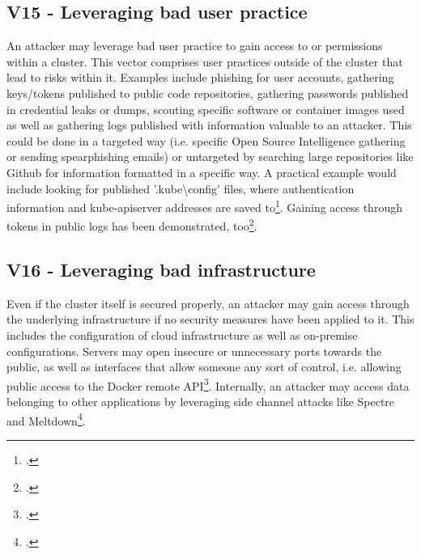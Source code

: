\subsection{V15 - Leveraging bad user practice}
An attacker may leverage bad user practice to gain access to or permissions within a cluster. 
This vector comprises user practices outside of the cluster that lead to risks within it.
Examples include phishing for user accounts, gathering keys/tokens published to public code repositories, gathering passwords published in credential leaks or dumps, scouting specific software or container images used as well as gathering logs published with information valuable to an attacker.
This could be done in a targeted way (i.e. specific Open Source Intelligence gathering or sending spearphishing emails) or untargeted by searching large repositories like Github for information formatted in a specific way. A practical example would include looking for published '.kube\textbackslash config' files, where authentication information and kube-apiserver addresses are saved to\footcite[][, section 'Define clusters, users, and contexts']{kubectlClusterAccess}. Gaining access through tokens in public logs has been demonstrated, too\footcite[][, section 'Results and notable findings']{ciKnew}.


\subsection{V16 - Leveraging bad infrastructure} \label{v16}
Even if the cluster itself is secured properly, an attacker may gain access through the underlying infrastructure if no security measures have been applied to it.
This includes the configuration of cloud infrastructure as well as on-premise configurations.
Servers may open insecure or unnecessary ports towards the public, as well as interfaces that allow someone any sort of control, i.e. allowing public access to the Docker remote API\footcite[][, section 'Publicly Accessible Docker Hosts']{dockerRemoteAccess}.
Internally, an attacker may access data belonging to other applications by leveraging side channel attacks like Spectre and Meltdown\footcite[][, section 'Which cloud providers are affected by Meltdown?']{spectreMeltdown}.

